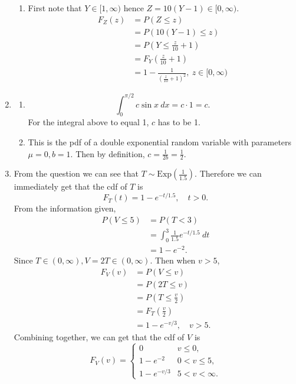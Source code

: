 \documentclass{article}
\begin{document}
\begin{enumerate}
\begin{enumerate}
        \item First note that $Y \in [1, \infty)$ hence $Z = 10(Y - 1) \in [0, \infty)$.
        \begin{align*}
            F_{Z}(z)
            &= P(Z \leq z) \\
            &= P(10(Y - 1) \leq z) \\
            &= P(Y \leq \frac{z}{10} + 1) \\
            &= F_Y(\frac{z}{10} + 1) \\
            &= 1 - \frac{1}{(\frac{z}{10} + 1)^2}, \ z \in [0, \infty)
        \end{align*}
    \end{enumerate}

    \item \begin{enumerate}
        \item \[ \int_{0}^{\pi / 2} c\sin{x} \ dx  = c \cdot 1 = c. \]
        For the integral above to equal 1, $c$ has to be 1.

        \item This is the pdf of a double exponential random variable with parameters \\
        $\mu = 0, b = 1$. Then by definition, $c = \frac{1}{2b} = \frac{1}{2}$.
    \end{enumerate}

    \item From the question we can see that $T \sim \text{Exp}(\frac{1}{1.5})$. Therefore 
    we can immediately get that the cdf of $T$ is 
    \[ F_{T}(t) = 1 - e^{-t/1.5}, \quad t > 0. \]
    From the information given, 
    \begin{align*}
        P(V \leq 5) 
        &= P(T < 3) \\
        &= \int_{0}^{3} \frac{1}{1.5} e^{-t/1.5} \ dt \\
        &= 1 - e^{-2}.
    \end{align*}
    Since $T \in (0, \infty), V = 2T \in (0, \infty)$. Then when $v > 5$, 
    \begin{align*}
        F_{V}(v) 
        &= P(V \leq v) \\
        &= P(2T \leq v) \\
        &= P(T \leq \frac{v}{2}) \\
        &= F_{T}(\frac{v}{2}) \\
        &= 1 - e^{-v/3}, \quad v > 5.
    \end{align*}
    Combining together, we can get that the cdf of $V$ is 
    \[ F_{V}(v) = \begin{cases}
        0 & v \leq 0, \\
        1 - e^{-2} & 0 < v \leq 5, \\
        1 - e^{-v/3} & 5 < v < \infty.
    \end{cases}\]
\end{enumerate}
\end{document}
